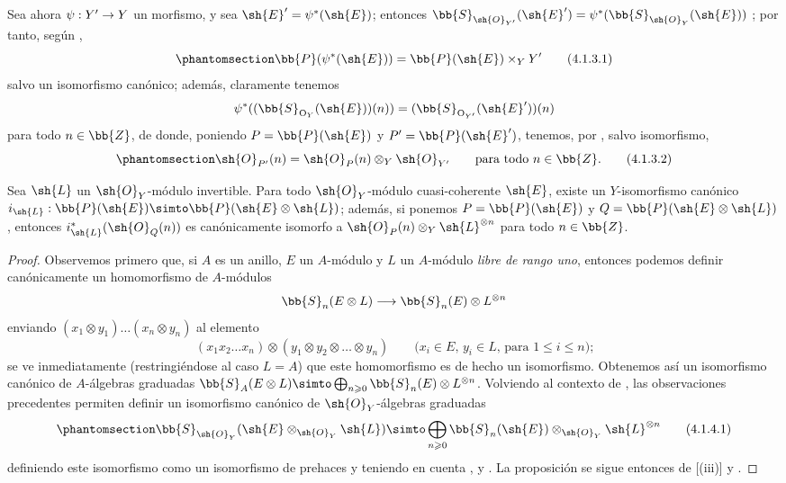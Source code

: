 \documentclass[oneside,10pt]{amsart}
\makeatletter
\renewcommand{\leq}{\leqslant}
\renewcommand{\geq}{\geqslant}
\newcommand{\ega@arrow}[2]{\mathchoice{#1}{#2}{#2}{#2}}
\renewcommand{\to}{\ega@arrow{\longrightarrow}{\rightarrow}}
\newcommand{\oldpage}[2][]{\marginnote{\normalfont\footnotesize\textbf{#1}~|~#2}\ignorespaces}
\let\EGAOriginalLabel\label
\renewcommand{\label}[1]{\phantomsection\EGAOriginalLabel{#1}}
\makeatother
\begin{document}
\begin{env}[4.1.3]
\label{II.4.1.3}
Sea ahora $\psi:Y'\to Y$ un morfismo, y sea $\sh{E}'=\psi^*(\sh{E})$;
entonces $\bb{S}_{\sh{O}_{Y'}}(\sh{E}') = \psi^*(\bb{S}_{\sh{O}_Y}(\sh{E}))$ ;
por tanto, según ,
\[
\label{II.4.1.3.1}
  \bb{P}(\psi^*(\sh{E})) = \bb{P}(\sh{E})\times_Y Y'
  \tag{4.1.3.1}
\]
salvo un isomorfismo canónico;
además, claramente tenemos
\[
  \psi^*((\bb{S}_{\mathrm{O}_Y}(\sh{E}))(n)) = (\bb{S}_{\mathrm{O}_{Y'}}(\sh{E}'))(n)
\]
para todo $n\in\bb{Z}$, de donde, poniendo $P=\bb{P}(\sh{E})$ y $P'=\bb{P}(\sh{E}')$, tenemos, por , salvo isomorfismo,
\[
\label{II.4.1.3.2}
  \sh{O}_{P'}(n) = \sh{O}_P(n)\otimes_Y\sh{O}_{Y'}
  \qquad\mbox{para todo $n\in\bb{Z}$.}
  \tag{4.1.3.2}
\]
\end{env}

\oldpage[II]{72}
\begin{proposition}[4.1.4]
\label{II.4.1.4}
Sea $\sh{L}$ un $\sh{O}_Y$-módulo invertible.
Para todo $\sh{O}_Y$-módulo cuasi-coherente $\sh{E}$, existe un $Y$-isomorfismo canónico $i_\sh{L}:\bb{P}(\sh{E})\simto\bb{P}(\sh{E}\otimes\sh{L})$;
además, si ponemos $P=\bb{P}(\sh{E})$ y $Q=\bb{P}(\sh{E}\otimes\sh{L})$, entonces $i_\sh{L}^*(\sh{O}_Q(n))$ es canónicamente isomorfo a $\sh{O}_P(n)\otimes_Y\sh{L}^{\otimes n}$ para todo $n\in\bb{Z}$.
\end{proposition}

\begin{proof}
Observemos primero que, si $A$ es un anillo, $E$ un $A$-módulo y $L$ un $A$-módulo \emph{libre de rango uno}, entonces podemos definir canónicamente un homomorfismo de $A$-módulos
\[
  \bb{S}_n(E\otimes L) \to \bb{S}_n(E)\otimes L^{\otimes n}
\]
enviando $(x_1\otimes y_1)\ldots(x_n\otimes y_n)$ al elemento
\[
  (x_1x_2\ldots x_n)\otimes(y_1\otimes y_2\otimes\ldots\otimes y_n)
  \qquad\mbox{($x_i\in E$, $y_i\in L$, para $1\leq i\leq n$);}
\]
se ve inmediatamente (restringiéndose al caso $L=A$) que este homomorfismo es de hecho un isomorfismo.
Obtenemos así un isomorfismo canónico de $A$-álgebras graduadas $\bb{S}_A(E\otimes L)\simto\bigoplus_{n\geq0}\bb{S}_n(E)\otimes L^{\otimes n}$.
Volviendo al contexto de , las observaciones precedentes permiten definir un isomorfismo canónico de $\sh{O}_Y$-álgebras graduadas
\[
\label{II.4.1.4.1}
  \bb{S}_{\sh{O}_Y}(\sh{E}\otimes_{\sh{O}_Y}\sh{L}) \simto \bigoplus_{n\geq0}\bb{S}_n(\sh{E})\otimes_{\sh{O}_Y}\sh{L}^{\otimes n}
  \tag{4.1.4.1}
\]
definiendo este isomorfismo como un isomorfismo de prehaces y teniendo en cuenta ,  y .
La proposición se sigue entonces de [(iii)] y .
\end{proof}
\end{document}
